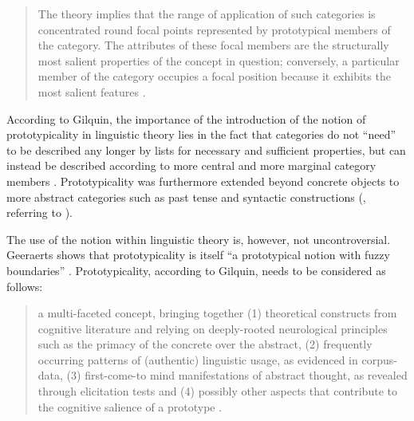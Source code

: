 \begin{quote}
The theory implies that the range of application of such categories is concentrated round focal points represented by prototypical members of the category. The attributes of these focal members are the structurally most salient properties of the concept in question; conversely, a particular member of the category occupies a focal position because it exhibits the most salient features \citep[578]{allan_lexical_2013}.
\end{quote}

According to Gilquin, the importance of the introduction of the notion of prototypicality in linguistic theory lies in the fact that categories do not ``need'' to be described any longer by lists for necessary and sufficient properties, but can instead be described according to more central and more marginal category members \citep[160--161]{gilquin_place_2006}. Prototypicality was furthermore extended beyond concrete objects to more abstract categories such as past tense and syntactic constructions (\citealt{gilquin_place_2006}, referring to \citealt{taylor_linguistic_1989}).

The use of the notion within linguistic theory is, however, not uncontroversial. Geeraerts shows that prototypicality is itself “a prototypical notion with fuzzy boundaries” \citep{Geeraerts2006}. Prototypicality, according to Gilquin, needs to be considered as follows:

\begin{quote}
a multi-faceted concept, bringing together (1) theoretical constructs from cognitive literature and relying on deeply-rooted neurological principles such as the primacy of the concrete over the abstract, (2) frequently occurring patterns of (authentic) linguistic usage, as evidenced in corpus-data, (3) first-come-to mind manifestations of abstract thought, as revealed through elicitation tests and (4) possibly other aspects that contribute to the cognitive salience of a prototype \citep[180]{gilquin_place_2006}.
\end{quote}

